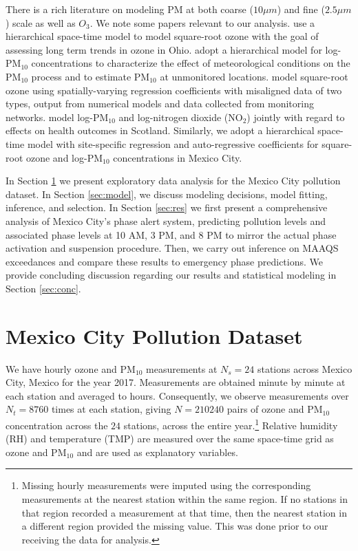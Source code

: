 \documentclass[alpha-refs]{wiley-article}
\begin{document}
There is a rich literature on modeling $\text{PM}$ at both coarse ($10 \mu m$) and fine ($2.5 \mu m$) scale as well as $O_{3}$. We note some papers relevant to our analysis. \citet{sahu2007} use a hierarchical space-time model to model square-root ozone with the goal of assessing long term trends in ozone in Ohio. \citet{cocchi2007} adopt a hierarchical model for log-$\text{PM}_{10}$ concentrations to characterize the effect of meteorological conditions on the $\text{PM}_{10}$ process and to estimate $\text{PM}_{10}$ at unmonitored locations. \citet{berrocal2010} model square-root ozone using spatially-varying regression coefficients \citep{gelfand2003} with misaligned  data of two types, output from numerical models and data collected from monitoring networks. \citet{huang2018} model log-$\text{PM}_{10}$ and log-nitrogen dioxide ($\text{NO}_2$) jointly with regard to effects on health outcomes in Scotland. Similarly, we adopt a hierarchical space-time model with site-specific regression and auto-regressive coefficients for square-root ozone and log-$\text{PM}_{10}$ concentrations in Mexico City.

In Section \ref{sec:data} we present exploratory data analysis for  the Mexico City pollution dataset. In Section \ref{sec:model}, we discuss modeling decisions, model fitting, inference, and  selection.
In Section \ref{sec:res} we first present a comprehensive analysis of Mexico City's phase alert system, predicting pollution levels and associated phase levels at 10 AM, 3 PM, and 8 PM to mirror the actual phase activation and suspension procedure. Then, we carry out inference on MAAQS exceedances and compare these results to emergency phase predictions. We provide concluding discussion regarding our results and statistical modeling in Section \ref{sec:conc}.

\section{Mexico City Pollution Dataset}\label{sec:data}

We have hourly ozone and $\text{PM}_{10}$ measurements at $N_s = 24$ stations across Mexico City, Mexico for the year 2017. Measurements are obtained minute by minute at each station and averaged to hours.
Consequently, we observe measurements over $N_t = 8760$ times at each station, giving $N = 210240$ pairs of ozone and $\text{PM}_{10}$ concentration across the $24$ stations, across the entire year.\footnote{Missing hourly measurements were imputed using the corresponding measurements at the nearest station within the same region. If no stations in that region recorded a measurement at that time, then the nearest station in a different region provided the missing value. This was done prior to our receiving the data for analysis.} Relative humidity (RH) and temperature (TMP) are measured over the same space-time grid as ozone and $\text{PM}_{10}$ and are used as explanatory variables.
\end{document}
